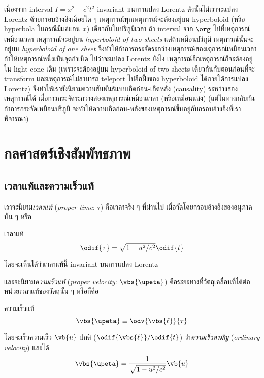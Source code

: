 เนื่องจาก interval $I = x^2 - c^2t^2$ invariant บนการแปลง Lorentz ดังนั้นไม่เราจะแปลง Lorentz ด้วยกรอบอ้างอิงเฉื่อยใด ๆ เหตุการณ์ทุกเหตุการณ์จะต้องอยู่บน hyperboloid (หรือ hyperbola ในกรณีมีแค่แกน $x$) เดียวกันในปริภูมิเวลา ถ้า interval จาก $\org$ ไปที่เหตุการณ์เหมือนเวลา เหตุการณ์จะอยู่บน \emph{hyperboloid of two sheets} แต่ถ้าเหมือนปริภูมิ เหตุการณ์นั้นจะอยู่บน \emph{hyperboloid of one sheet} จึงทำให้ถ้าการกระจัดระกว่างเหตุการณ์สองเตุการณ์เหมือนเวลา ถ้าให้เหตุการณ์หนึ่งเป็นจุดกำเนิด ไม่ว่าจะแปลง Lorentz ยังไง เหตุการณ์อีกเหตุการณ์ก็จะต้องอยู่ใน light cone เดิม (เพราะจะต้องอยู่บน hyperboloid of two sheets เดียวกันกับตอนก่อนที่จะ transform และเหตุการณ์ไม่สามารถ teleport ไปอีกฝั้งของ hyperboloid ได้ภายใต้การแปลง Lorentz) จึงทำให้เรายังนิยามความสัมพันธ์แบบเกิดก่อน-เกิดหลัง (causality) ระหว่างสองเหตุการณ์ได้ เมื่อการกระจัดระกว่างสองเหตุการณ์เหมือนเวลา (หรือเหมือนแสง) (แต่ในทางกลับกัน ถ้าการกระจัดเหมือนปริภูมิ จะทำให้ความเกิดก่อน-หลังของเหตุการณ์ขึ้นอยู่กับกรอบอ้างอิงที่เราพิจารณา)

\section{กลศาสตร์เชิงสัมพัทธภาพ}

\subsection{เวลาแท้และความเร็วแท้}

เราจะนิยาม\emph{เวลาแท้} (\emph{proper time}: $\tau$) คือเวลาจริง ๆ ที่ผ่านไป เมื่อวัดโดยกรอบอ้างอิงของอนุภาคนั้น ๆ หรือ
\begin{defbox}{เวลาแท้}
    \begin{equation}
        \odif{\tau} = \sqrt{1 - u^2/c^2}\odif{t}
    \end{equation}
\end{defbox}
โดยจะเห็นได้ว่าเวลาแท้นี้ invariant บนการแปลง Lorentz

และจะนิยาม\emph{ความเร็วแท้} (\emph{proper velocity}: $\vbs{\upeta}$) คือระยะทางที่วัตถุเคลื่อนที่ได้ต่อหน่วยเวลาแท้ของวัตถุนั้น ๆ หรือก็คือ
\begin{defbox}{ความเร็วแท้}
    \begin{equation}
        \vbs{\upeta} \equiv \odv{\vbs{\ell}}{\tau}
    \end{equation}
\end{defbox}
โดยจะเร็วความเร็ว $\vb{u}$ ปกติ ($\odif{\vbs{\ell}}/\odif{t}$) ว่า\emph{ความเร็วสามัญ} (\emph{ordinary velocity}) และได้
\begin{equation}
    \vbs{\upeta} = \frac{1}{\sqrt{1 - u^2/c^2}}\vb{u}
\end{equation}

